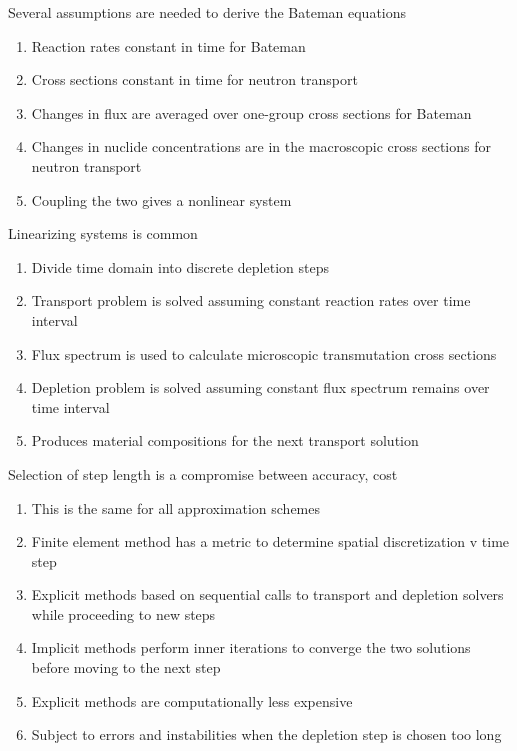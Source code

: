 \documentclass[aspectratio=1610,pdftex,dvipsnames,compress,xcolor={dvipsnames}]{beamer}
\begin{document}
\begin{frame}{Several assumptions are needed to derive the Bateman equations}
    \begin{enumerate}[series=outerlist,topsep=0pt,itemsep=21pt,leftmargin=*,label=(\arabic*)]
        \item[]Reaction rates constant in time for Bateman
        \item[]Cross sections constant in time for neutron transport
        \item[]Changes in flux are averaged over one-group cross sections for Bateman
        \item[]Changes in nuclide concentrations are in the macroscopic cross sections for neutron transport
        \item[]Coupling the two gives a nonlinear system
    \end{enumerate}
\end{frame}


\begin{frame}{Linearizing systems is common}
    \begin{enumerate}[series=outerlist,topsep=0pt,itemsep=21pt,leftmargin=*,label=(\arabic*)]
        \item[]Divide time domain into discrete depletion steps
        \item[]Transport problem is solved assuming constant reaction rates over time interval
        \item[]Flux spectrum is used to calculate microscopic transmutation cross sections
        \item[]Depletion problem is solved assuming constant flux spectrum remains over time interval
        \item[]Produces material compositions for the next transport solution
    \end{enumerate}
\end{frame}


\begin{frame}{Selection of step length is a compromise between accuracy, cost}
    \begin{enumerate}[series=outerlist,topsep=0pt,itemsep=21pt,leftmargin=*,label=(\arabic*)]
        \item[]This is the same for all approximation schemes
        \item[]Finite element method has a metric to determine spatial discretization v time step
        \item[]Explicit methods based on sequential calls to transport and depletion solvers while proceeding to new steps
        \item[]Implicit methods perform inner iterations to converge the two solutions before moving to the next step
        \item[]Explicit methods are computationally less expensive
        \item[]Subject to errors and instabilities when the depletion step is chosen too long
    \end{enumerate}
\end{frame}
\end{document}
